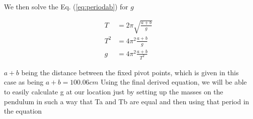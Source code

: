 \documentclass{report}
\begin{document}
We then solve the Eq. (\ref{eq:periodab}) for $g$

\begin{equation}
    \begin{aligned}
        T&=2\pi \sqrt{\frac{a+b}{ g }} \\
        T^2&=4\pi^2 \frac{a+b}{ g } \\
        g&=4\pi^2\frac{ a+b }{ T^2 }
    \end{aligned}
\end{equation}

$a+b$ being the distance between the fixed pivot points, which is given in this case as being $a+b=100.06cm$
Using the final derived equation, we will be able to easily calculate g at our location just by setting up the masses on the pendulum in such a way that Ta and Tb are equal and then using that period in the equation
\end{document}
